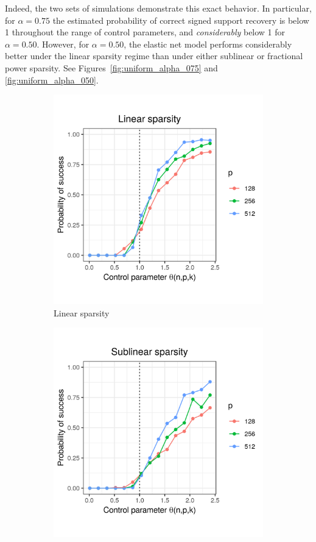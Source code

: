 \documentclass[letterpaper,12pt]{article}
\begin{document}
Indeed, the two sets of simulations demonstrate this exact
behavior. In particular, for $\alpha = 0.75$ the estimated probability
of correct signed support recovery is below 1 throughout the range of
control parameters, and \emph{considerably} below 1 for
$\alpha = 0.50$. However, for $\alpha = 0.50$, the elastic net model
performs considerably better under the linear sparsity regime than
under either sublinear or fractional power sparsity. See
Figures~\ref{fig:uniform_alpha_075} and \ref{fig:uniform_alpha_050}.

\begin{figure}[h]
  \centering
  \begin{subfigure}{0.32\textwidth}
    \includegraphics[width=0.9\linewidth]{uniform_linear_sparsity_alpha_075}
    \caption{Linear sparsity}
    \label{fig:uniform_linear_sparsity_alpha_1}
  \end{subfigure}
  \begin{subfigure}{0.32\textwidth}
    \includegraphics[width=0.9\linewidth]{uniform_sublinear_sparsity_alpha_075}

\end{subfigure}
\end{figure}
\end{document}
